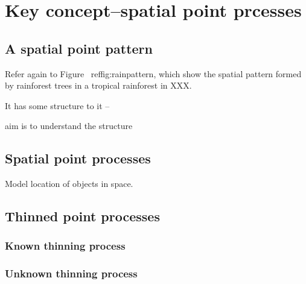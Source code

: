 \chapter{Key concept--spatial point prcesses}


\section{A spatial point pattern}

Refer again to Figure \ ref{fig:rainpattern}, which show the spatial pattern formed by rainforest trees in a tropical rainforest in XXX. 

It has some structure to it -- 

aim is to understand the structure

\section{Spatial point processes}

Model location of objects in space.

\section{Thinned point processes}

\subsection{Known thinning process}

\subsection{Unknown thinning process}


